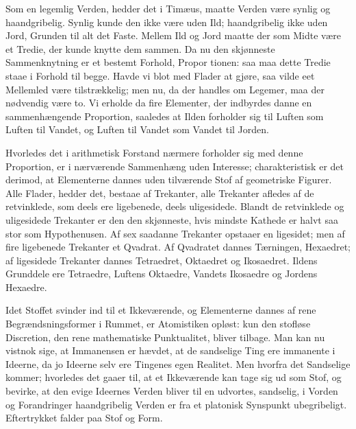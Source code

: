 \documentclass[12pt,a4paper]{book}
\begin{document}
Som en legemlig Verden, hedder det i Timæus, maatte Verden være synlig og
haandgribelig. Synlig kunde den ikke være uden Ild; haandgribelig ikke uden
Jord, Grunden til alt det Faste. Mellem Ild og Jord maatte der som Midte være
et Tredie, der kunde knytte dem sammen. Da nu den skjønneste Sammenknytning er
et bestemt Forhold, Propor\-%
tionen: saa maa dette Tredie staae i Forhold til begge. Havde vi blot med
Flader at gjøre, saa vilde eet Mellemled være tilstrækkelig; men nu, da der
handles om Legemer, maa der nødvendig være to. Vi erholde da fire Elementer,
der indbyrdes danne en sammenhængende Proportion, saaledes at Ilden forholder
sig til Luften som Luften til Vandet, og Luften til Vandet som Vandet til
Jorden.

Hvorledes det i arithmetisk Forstand nærmere forholder sig med denne
Proportion, er i nærværende Sammenhæng uden Interesse; charakteristisk er det
derimod, at Elementerne dannes uden tilværende Stof af geometriske Figurer.
Alle Flader, hedder det, bestaae af Trekanter, alle Trekanter afledes af de
retvinklede, som deels ere ligebenede, deels uligesidede. Blandt de
retvinklede og uligesidede Trekanter er den den skjønneste, hvis mindste
Kathede er halvt saa stor som Hypothenusen. Af sex saadanne Trekanter opstaaer
en ligesidet; men af fire ligebenede Trekanter et Qvadrat. Af Qvadratet dannes
Tærningen, Hexaedret; af ligesidede Trekanter dannes Tetraedret, Oktaedret og
Ikosaedret. Ildens Grunddele ere Tetraedre, Luftens Oktaedre, Vandets
Ikosaedre og Jordens Hexaedre.

Idet Stoffet svinder ind til et Ikkeværende, og Elementerne dannes af rene
Begrændsningsformer i Rummet, er Atomistiken opløst: kun den stofløse
Discretion, den rene mathematiske Punktualitet, bliver tilbage. Man kan nu
vistnok sige, at Immanensen er hævdet, at de sandselige Ting ere immanente i
Ideerne, da jo Ideerne selv ere Tingenes egen Realitet. Men hvorfra det
Sandselige kommer; hvorledes det gaaer til, at et Ikkeværende kan tage sig ud
som Stof, og bevirke, at den evige Ideernes Verden bliver til en udvortes,
sandselig, i Vorden og Forandringer haandgribelig Verden er fra et platonisk
Synspunkt ubegribeligt. Eftertrykket falder paa Stof og Form.
\end{document}
